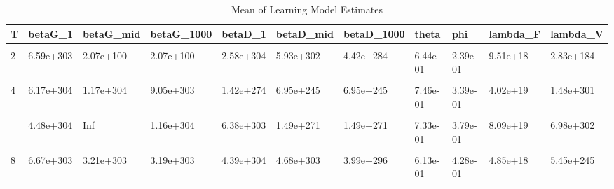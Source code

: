 \begin{table}[!h]
\centering
\caption{Mean of Learning Model Estimates}
\centering
\begin{tabular}[t]{lllllllllll}
\toprule
T & betaG\_1 & betaG\_mid & betaG\_1000 & betaD\_1 & betaD\_mid & betaD\_1000 & theta & phi & lambda\_F & lambda\_V\\
\midrule
\cellcolor{gray!10}{1} & \cellcolor{gray!10}{1.69e+304} & \cellcolor{gray!10}{2.71e+234} & \cellcolor{gray!10}{2.71e+234} & \cellcolor{gray!10}{3.95e+304} & \cellcolor{gray!10}{6.44e+303} & \cellcolor{gray!10}{3.78e+303} & \cellcolor{gray!10}{6.72e-01} & \cellcolor{gray!10}{5.43e-01} & \cellcolor{gray!10}{1.25e+16} & \cellcolor{gray!10}{1.16e+304}\\
2 & 6.59e+303 & 2.07e+100 & 2.07e+100 & 2.58e+304 & 5.93e+302 & 4.42e+284 & 6.44e-01 & 2.39e-01 & 9.51e+18 & 2.83e+184\\
\cellcolor{gray!10}{3} & \cellcolor{gray!10}{4.43e+304} & \cellcolor{gray!10}{2.89e+303} & \cellcolor{gray!10}{2.89e+303} & \cellcolor{gray!10}{2.32e+304} & \cellcolor{gray!10}{1.02e+304} & \cellcolor{gray!10}{1.02e+304} & \cellcolor{gray!10}{5.68e-01} & \cellcolor{gray!10}{4.83e-01} & \cellcolor{gray!10}{6.57e+20} & \cellcolor{gray!10}{5.76e+303}\\
4 & 6.17e+304 & 1.17e+304 & 9.05e+303 & 1.42e+274 & 6.95e+245 & 6.95e+245 & 7.46e-01 & 3.39e-01 & 4.02e+19 & 1.48e+301\\
\cellcolor{gray!10}{5} & \cellcolor{gray!10}{3.02e+304} & \cellcolor{gray!10}{3.30e+303} & \cellcolor{gray!10}{3.30e+303} & \cellcolor{gray!10}{9.93e+303} & \cellcolor{gray!10}{1.26e+291} & \cellcolor{gray!10}{1.26e+291} & \cellcolor{gray!10}{6.99e-01} & \cellcolor{gray!10}{3.54e-01} & \cellcolor{gray!10}{4.10e+19} & \cellcolor{gray!10}{4.56e+297}\\
\addlinespace
6 & 4.48e+304 & Inf & 1.16e+304 & 6.38e+303 & 1.49e+271 & 1.49e+271 & 7.33e-01 & 3.79e-01 & 8.09e+19 & 6.98e+302\\
\cellcolor{gray!10}{7} & \cellcolor{gray!10}{3.46e+303} & \cellcolor{gray!10}{5.20e+301} & \cellcolor{gray!10}{5.21e+240} & \cellcolor{gray!10}{4.90e+304} & \cellcolor{gray!10}{Inf} & \cellcolor{gray!10}{Inf} & \cellcolor{gray!10}{6.11e-01} & \cellcolor{gray!10}{4.00e-01} & \cellcolor{gray!10}{2.41e+01} & \cellcolor{gray!10}{7.75e+297}\\
8 & 6.67e+303 & 3.21e+303 & 3.19e+303 & 4.39e+304 & 4.68e+303 & 3.99e+296 & 6.13e-01 & 4.28e-01 & 4.85e+18 & 5.45e+245\\
\bottomrule
\end{tabular}
\end{table}